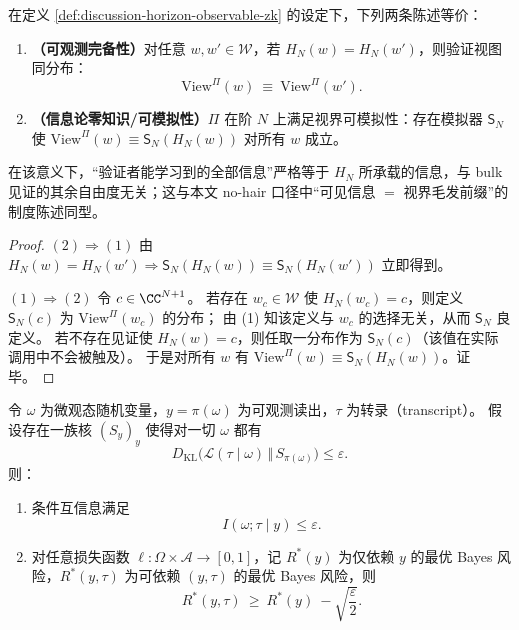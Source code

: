 \begin{proposition}\label{prop:discussion-nohair-iff-zk}
在定义 \ref{def:discussion-horizon-observable-zk} 的设定下，下列两条陈述等价：
\begin{enumerate}
  \item \textbf{（可观测完备性）}对任意 \(w,w'\in\mathcal{W}\)，若 \(H_N(w)=H_N(w')\)，则验证视图同分布：
  \[
  \mathrm{View}^{\Pi}(w)\ \equiv\ \mathrm{View}^{\Pi}(w').
  \]
  \item \textbf{（信息论零知识/可模拟性）}\(\Pi\) 在阶 \(N\) 上满足视界可模拟性：存在模拟器 \(\mathsf{S}_N\) 使 \(\mathrm{View}^{\Pi}(w)\equiv \mathsf{S}_N(H_N(w))\) 对所有 \(w\) 成立。
\end{enumerate}
在该意义下，“验证者能学习到的全部信息”严格等于 \(H_N\) 所承载的信息，与 bulk 见证的其余自由度无关；这与本文 no-hair 口径中“可见信息 \(=\) 视界毛发前缀”的制度陈述同型。
\end{proposition}

\begin{proof}
\((2)\Rightarrow(1)\) 由 \(H_N(w)=H_N(w')\Rightarrow \mathsf{S}_N(H_N(w))\equiv \mathsf{S}_N(H_N(w'))\) 立即得到。
\par
\((1)\Rightarrow(2)\) 令 \(c\in\CC^{N+1}\)。
若存在 \(w_c\in\mathcal{W}\) 使 \(H_N(w_c)=c\)，则定义 \(\mathsf{S}_N(c)\) 为 \(\mathrm{View}^\Pi(w_c)\) 的分布；
由 (1) 知该定义与 \(w_c\) 的选择无关，从而 \(\mathsf{S}_N\) 良定义。
若不存在见证使 \(H_N(w)=c\)，则任取一分布作为 \(\mathsf{S}_N(c)\)（该值在实际调用中不会被触及）。
于是对所有 \(w\) 有 \(\mathrm{View}^\Pi(w)\equiv \mathsf{S}_N(H_N(w))\)。证毕。
\end{proof}

\begin{theorem}\label{thm:discussion-epszk-cmi-and-risk-improvement-bound}
令 \(\omega\) 为微观态随机变量，\(y=\pi(\omega)\) 为可观测读出，\(\tau\) 为转录（transcript）。
假设存在一族核 \((S_y)_{y}\) 使得对一切 \(\omega\) 都有
\[
D_{\mathrm{KL}}\!\bigl(\mathcal L(\tau\mid \omega)\,\Vert\, S_{\pi(\omega)}\bigr)\le \varepsilon.
\]
则：
\begin{enumerate}
  \item 条件互信息满足
  \[
  I(\omega;\tau\mid y)\le \varepsilon.
  \]
  \item 对任意损失函数 \(\ell:\Omega\times\mathcal A\to[0,1]\)，记
  \(R^\ast(y)\) 为仅依赖 \(y\) 的最优 Bayes 风险，\(R^\ast(y,\tau)\) 为可依赖 \((y,\tau)\) 的最优 Bayes 风险，则
  \[
  R^\ast(y,\tau)\ \ge\ R^\ast(y)\ -\sqrt{\frac{\varepsilon}{2}}.
  \]
\end{enumerate}
\end{theorem}


